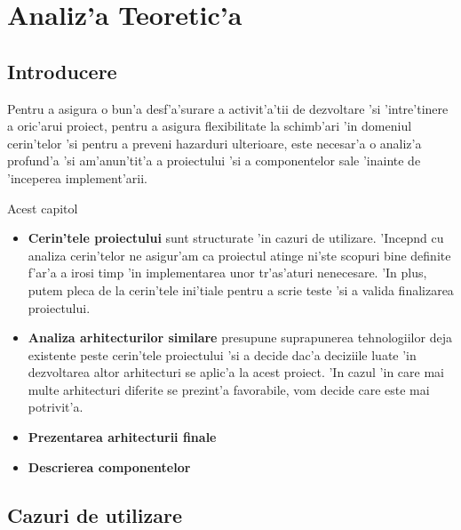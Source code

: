 \chapter{Analiz'a Teoretic'a}
%
\section{Introducere}
%
%

Pentru a asigura o bun'a desf'a'surare a activit'a'tii de dezvoltare 'si 'intre'tinere a oric'arui proiect, pentru a asigura flexibilitate la schimb'ari 'in domeniul cerin'telor 'si pentru a preveni hazarduri ulterioare, este necesar'a o analiz'a profund'a 'si am'anun'tit'a a proiectului 'si a componentelor sale 'inainte de 'inceperea implement'arii.

\medskip

Acest capitol 

\begin{itemize}
\item {\bf Cerin'tele proiectului} sunt structurate 'in cazuri de utilizare. 'Incep{\ia}nd cu analiza cerin'telor ne asigur'am ca proiectul atinge ni'ste scopuri bine definite f'ar'a a irosi timp 'in implementarea unor tr'as'aturi nenecesare. 'In plus, putem pleca de la cerin'tele ini'tiale pentru a scrie teste 'si a valida finalizarea proiectului.
\item {\bf Analiza arhitecturilor similare} presupune suprapunerea tehnologiilor deja existente peste cerin'tele proiectului 'si a decide dac'a deciziile luate 'in dezvoltarea altor arhitecturi se aplic'a la acest proiect. 'In cazul 'in care mai multe arhitecturi diferite se prezint'a favorabile, vom decide care este mai potrivit'a.
\item {\bf Prezentarea arhitecturii finale}
\item {\bf Descrierea componentelor}
\end{itemize}

\clearpage

\section{Cazuri de utilizare}

